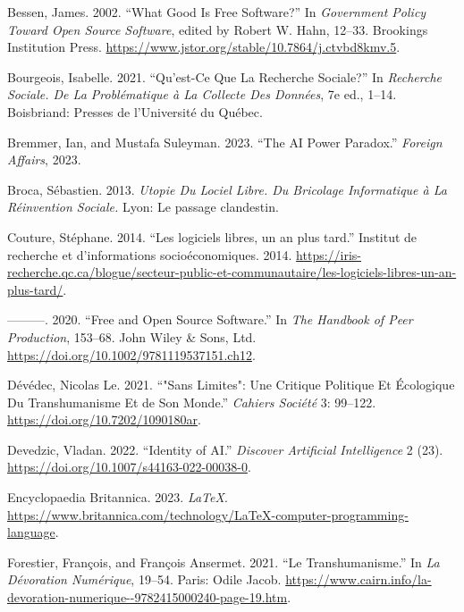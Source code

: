 \documentclass[
  letterpaper,
]{scrbook}
\newlength{\cslhangindent}
\newlength{\cslentryspacingunit} %
\newenvironment{CSLReferences}[2] %
 {%
  \setlength{\parindent}{0pt}
  \ifodd #1
  \let\oldpar\par
  \def\par{\hangindent=\cslhangindent\oldpar}
  \fi
  \setlength{\parskip}{#2\cslentryspacingunit}
 }%
 {}
\begin{document}
\begin{CSLReferences}{1}{0}
\leavevmode{}%
Bessen, James. 2002. {``What {Good Is Free Software}?''} In
\emph{Government {Policy} Toward {Open Source Software}}, edited by
Robert W. Hahn, 12--33. Brookings Institution Press.
\url{https://www.jstor.org/stable/10.7864/j.ctvbd8kmv.5}.

\leavevmode{}%
Bourgeois, Isabelle. 2021. {``Qu'est-Ce Que La Recherche Sociale?''} In
\emph{Recherche Sociale. {De} La Problématique à La Collecte Des
Données}, 7e ed., 1--14. Boisbriand: Presses de l'Université du Québec.

\leavevmode{}%
Bremmer, Ian, and Mustafa Suleyman. 2023. {``The {AI Power Paradox}.''}
\emph{Foreign Affairs}, 2023.

\leavevmode{}%
Broca, Sébastien. 2013. \emph{Utopie Du Lociel Libre. {Du} Bricolage
Informatique à La Réinvention Sociale.} Lyon: Le passage clandestin.

\leavevmode{}%
Couture, Stéphane. 2014. {``Les logiciels libres, un an plus tard.''}
Institut de recherche et d'informations socioéconomiques. 2014.
\url{https://iris-recherche.qc.ca/blogue/secteur-public-et-communautaire/les-logiciels-libres-un-an-plus-tard/}.

\leavevmode{}%
---------. 2020. {``Free and {Open Source Software}.''} In \emph{The
{Handbook} of {Peer Production}}, 153--68. John Wiley \& Sons, Ltd.
\url{https://doi.org/10.1002/9781119537151.ch12}.

\leavevmode{}%
Dévédec, Nicolas Le. 2021. {``"{Sans} Limites": Une Critique Politique
Et Écologique Du Transhumanisme Et de Son Monde.''} \emph{Cahiers
Société} 3: 99--122. \url{https://doi.org/10.7202/1090180ar}.

\leavevmode{}%
Devedzic, Vladan. 2022. {``Identity of {AI}.''} \emph{Discover
Artificial Intelligence} 2 (23).
\url{https://doi.org/10.1007/s44163-022-00038-0}.

\leavevmode{}%
Encyclopaedia Britannica. 2023. \emph{{LaTeX}}.
\url{https://www.britannica.com/technology/LaTeX-computer-programming-language}.

\leavevmode{}%
Forestier, François, and François Ansermet. 2021. {``Le
Transhumanisme.''} In \emph{La {Dévoration Numérique}}, 19--54. Paris:
Odile Jacob.
\url{https://www.cairn.info/la-devoration-numerique--9782415000240-page-19.htm}.


\end{CSLReferences}
\end{document}
